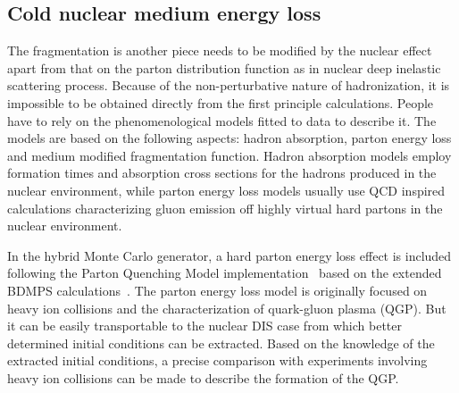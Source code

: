 \subsection{Cold nuclear medium energy loss} \label{sec:energy_loss}
The fragmentation is another piece needs to be modified by the nuclear effect
apart from that on the parton distribution function as in nuclear deep inelastic
scattering process. Because of the non-perturbative nature of hadronization, it
is impossible to be obtained directly from the first principle calculations. People have
to rely on the phenomenological models fitted to data to describe it. The models
are based on the following aspects: hadron absorption, parton energy loss and medium
modified fragmentation function. Hadron absorption models employ formation
times and absorption cross sections for the hadrons produced in the nuclear
environment, while parton energy loss models usually use QCD inspired
calculations characterizing gluon emission off highly virtual hard partons in
the nuclear environment.

In the hybrid Monte Carlo generator, a hard parton energy loss effect is
included following the Parton Quenching Model
implementation~\cite{Dupre:2011afa} based on the extended BDMPS
calculations~\cite{Salgado:2003gb}. The parton energy loss model is originally
focused on heavy ion collisions and the characterization of quark-gluon plasma
(QGP). But it can be easily transportable to the nuclear DIS case from which better
determined initial conditions can be extracted. Based on the knowledge
of the extracted initial conditions, a precise comparison with experiments
involving heavy ion collisions can be made to describe the formation of the QGP.

